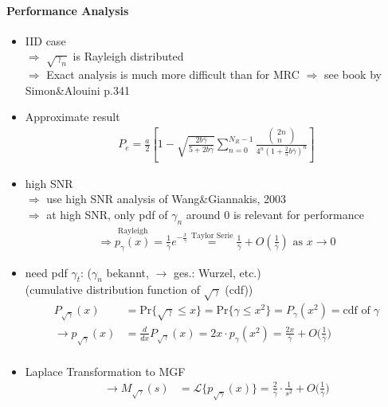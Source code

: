 \documentclass[a4paper, 10pt]{article}
\begin{document}
\paragraph{Performance Analysis}
\begin{itemize}
	\item IID case \\
	$\Rightarrow$ $\sqrt{\gamma_n}$ is Rayleigh distributed\\
	$\Rightarrow$ Exact analysis is much more difficult than for MRC $\Rightarrow$ see book by Simon\;\&\;Alouini p.341
	\item Approximate result
\begin{align*}
	P_e=\frac{a}{2}\left[1-\sqrt{\frac{2b\bar{\gamma}}{5+2b\bar{\gamma}}}\sum\limits_{n=0}^{N_R-1}\frac{\left(\! \begin{array}{c} 2n \\ n \end{array} \!\right) }{4^n(1+\frac{2}{5}b\bar{\gamma})^n}\right]
\end{align*}
	\item high SNR\\
	$\Rightarrow$ use high SNR analysis of Wang\;\&\;Giannakis, 2003\\
	$\Rightarrow$ at high SNR, only pdf of $\gamma_n$ around $0$ is relevant for performance
\begin{align*}
	\Rightarrow \overset{\text{Rayleigh}}{p_\gamma(x)} = \frac{1}{\bar{\gamma}}e^{-\frac{x}{\bar{\gamma}}}\overset{\text{Taylor Serie}}{=}\frac{1}{\bar{\gamma}}+O\left(\frac{1}{\bar{\gamma}}\right)\text{ as } x \to 0
\end{align*}
	\item need pdf $\gamma _t$: ($\gamma _n$ bekannt, $\rightarrow$ ges.: Wurzel, etc.)\\ (cumulative distribution function of $\sqrt{\gamma} $ (cdf))
	\begin{align*}
		P_{\sqrt{\gamma}}(x) &= \text{Pr}\bigl\{\sqrt{\gamma}\leq x \bigr\} = \text{Pr}\bigl\{\gamma\leq x^2 \bigr\} = P_{\gamma}(x^2) = \text{cdf of}\;\gamma\\
		\rightarrow p_{\sqrt{\gamma}}(x) &= \frac{d}{dx}P_{\sqrt{\gamma}}(x) = 2x\cdot p_{\gamma}(x^2) = \frac{2x}{\bar{\gamma}} + O\bigl(\frac{1}{\bar{\gamma}}\bigr)\\
	\end{align*}
	\item Laplace Transformation to MGF
	\begin{align*}
		\rightarrow M_{\sqrt{\gamma}}(s) &= \mathcal{L}\bigl\{p_{\sqrt{\gamma}}(x)\bigr\} = \frac{2}{\bar{\gamma}}\cdot \frac{1}{s^2} + O\bigl(\frac{1}{\bar{\gamma}}\bigr)\\

\end{align*}
\end{itemize}
\end{document}
